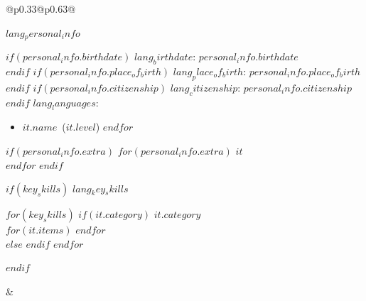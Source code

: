 \documentclass[$style.fontsize$,a4paper]{article}
\newcommand{\headleft}[1]{%
    \vspace*{0.4cm}\textsc{\textbf{#1}}\par%
    \vspace*{-1.1ex}\hrulefill\par\vspace*{0.12cm}%
}
\newcommand{\skillbadge}[1]{%
    \tikz[baseline=(char.base)]{%
        \node[%
            shape=rectangle, %
            rounded corners=3pt, %
            inner sep=2pt, %
            fill=primary!10%
        ] (char) {\small\textbf{#1}};%
    }%
}
\newcommand{\skillcategory}[1]{%
    {\small\textit{#1}}\\%
}
\newlength{\leftcolumnleftmargin}\setlength{\leftcolumnleftmargin}{0.6cm}
\begin{document}
\begin{tabular}[t]{%
        @{}p{0.33\textwidth}@{\textwidth}p{0.63\textwidth}@{}%
    }
\begin{minipage}[t]{%
            \dimexpr0.325\textwidth-2\leftcolumnleftmargin%
        }
            \headleft{$lang_personal_info$}
            {%
                $if(personal_info.birthdate)$ %
                    $lang_birthdate$: \textbf{$personal_info.birthdate$} \\[0.5ex]
                $endif$
                $if(personal_info.place_of_birth)$ %
                    $lang_place_of_birth$: \textbf{$personal_info.place_of_birth$} \\[0.5ex]
                $endif$
                $if(personal_info.citizenship)$ %
                    $lang_citizenship$: \textbf{$personal_info.citizenship$} \\[0.5ex]
                $endif$%
                $lang_languages$: \\[0.4ex] %
                \begin{itemize}[leftmargin=0.4cm, itemsep=0pt, label=-\ ]
                    $for(personal_info.languages)$
                        \item \textbf{$it.name$}~($it.level$)
                    $endfor$
                \end{itemize} \par\vspace{0.7ex}
                $if(personal_info.extra)$ %
                    $for(personal_info.extra)$
                        $it$\\[0.5ex]
                    $endfor$%
                $endif$%
            }
            
            $if(key_skills)$\headleft{$lang_key_skills$}{
                \vspace*{0.2cm}%
                \parbox{\linewidth}{%
                    \raggedright \linespread{1.08}\selectfont%
                    $for(key_skills)$%
                        $if(it.category)$%
                            \skillcategory{$it.category$}%
                            $for(it.items)$\skillbadge{$it$}\hspace{0.09cm}$endfor$\\[0.1cm]%
                        $else$%
                            \skillbadge{$it$}\hspace{0.09cm}%
                        $endif$%
                    $endfor$%
                }%
            }
            $endif$

        \end{minipage} &


\end{tabular}
\end{document}
